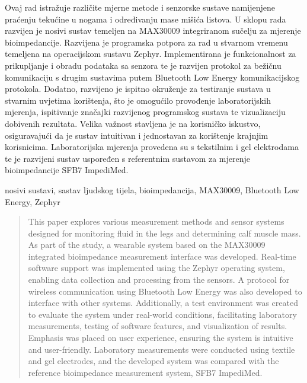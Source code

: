 \documentclass[diplomskirad, numeric, utf8, times]{fer}
\begin{document}

\begin{sazetak}

Ovaj rad istražuje različite mjerne metode i senzorske sustave namijenjene 
praćenju tekućine u nogama i određivanju mase mišića listova.
U sklopu rada razvijen je nosivi sustav temeljen na MAX30009 integriranom sučelju za mjerenje bioimpedancije. 
Razvijena je programska potpora za rad u stvarnom vremenu temeljena na operacijskom sustavu Zephyr. 
Implementirana je funkcionalnost za prikupljanje i obradu podataka sa senzora te je razvijen 
protokol za bežičnu komunikaciju s drugim sustavima putem Bluetooth Low Energy komunikacijskog protokola.
Dodatno, razvijeno je ispitno okruženje za testiranje sustava u stvarnim uvjetima korištenja, 
što je omogućilo provođenje laboratorijskih mjerenja, ispitivanje značajki razvijenog programskog sustava 
te vizualizaciju dobivenih rezultata. 
Velika važnost stavljena je na korisničko iskustvo, osiguravajući da je sustav intuitivan i 
jednostavan za korištenje krajnjim korisnicima.
Laboratorijska mjerenja provedena su s tekstilnim i gel elektrodama te je razvijeni sustav uspoređen 
s referentnim sustavom za mjerenje bioimpedancije SFB7 ImpediMed.

\end{sazetak}

\begin{kljucnerijeci}
nosivi sustavi, sastav ljudskog tijela, bioimpedancija, MAX30009, Bluetooth Low Energy, Zephyr 
\end{kljucnerijeci}


\begin{abstract}
This paper explores various measurement methods and sensor systems designed for monitoring fluid 
in the legs and determining calf muscle mass. 
As part of the study, a wearable system based on the MAX30009 integrated bioimpedance 
measurement interface was developed. 
Real-time software support was implemented using the Zephyr operating system, 
enabling data collection and processing from the sensors. 
A protocol for wireless communication using Bluetooth Low Energy 
was also developed to interface with other systems.
Additionally, a test environment was created to evaluate the system under real-world conditions, 
facilitating laboratory measurements, testing of software features, 
and visualization of results. Emphasis was placed on user experience, 
ensuring the system is intuitive and user-friendly. 
Laboratory measurements were conducted using textile and gel electrodes, 
and the developed system was compared with the reference bioimpedance measurement system, SFB7 ImpediMed.
\end{abstract}
\end{document}

